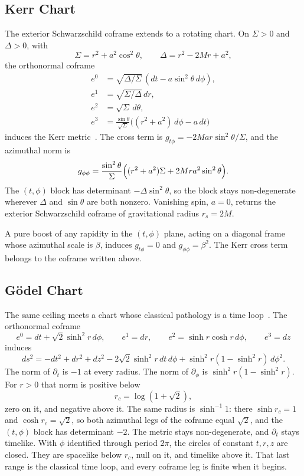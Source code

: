 \documentclass[a4paper]{article}
\begin{document}
\subsection{Kerr Chart}
\label{subsec:kerr}

The exterior Schwarzschild coframe extends to a rotating chart. On $\Sigma>0$ and $\Delta>0$, with
\[
\Sigma=r^2+a^2\cos^2\theta,\qquad\Delta=r^2-2Mr+a^2,
\]
the orthonormal coframe
\begin{align*}
e^0&=\sqrt{\Delta/\Sigma}\,(dt-a\sin^2\theta\,d\phi),\\
e^1&=\sqrt{\Sigma/\Delta}\,dr,\\
e^2&=\sqrt{\Sigma}\,d\theta,\\
e^3&=\frac{\sin\theta}{\sqrt{\Sigma}}\bigl((r^2+a^2)\,d\phi-a\,dt\bigr)
\end{align*}
induces the Kerr metric~\cite{kerr1963}. The cross term is $g_{t\phi}=-2Mar\sin^2\theta/\Sigma$, and the azimuthal norm is
\[
g_{\phi\phi}=\frac{\sin^2\theta}{\Sigma}\Bigl((r^2+a^2)\Sigma+2Mra^2\sin^2\theta\Bigr).
\]
The $(t,\phi)$ block has determinant $-\Delta\sin^2\theta$, so the block stays non-degenerate wherever $\Delta$ and $\sin\theta$ are both nonzero. Vanishing spin, $a=0$, returns the exterior Schwarzschild coframe of gravitational radius $r_s=2M$.

A pure boost of any rapidity in the $(t,\phi)$ plane, acting on a diagonal frame whose azimuthal scale is $\beta$, induces $g_{t\phi}=0$ and $g_{\phi\phi}=\beta^2$. The Kerr cross term belongs to the coframe written above.

\subsection{Gödel Chart}
\label{subsec:godel}

The same ceiling meets a chart whose classical pathology is a time loop~\cite{godel1949}. The orthonormal coframe
\[
e^0=dt+\sqrt{2}\sinh^2 r\,d\phi,\qquad
e^1=dr,\qquad
e^2=\sinh r\cosh r\,d\phi,\qquad
e^3=dz
\]
induces
\[
ds^2=-dt^2+dr^2+dz^2-2\sqrt{2}\sinh^2 r\,dt\,d\phi+\sinh^2 r(1-\sinh^2 r)\,d\phi^2.
\]
The norm of $\partial_t$ is $-1$ at every radius. The norm of $\partial_\phi$ is $\sinh^2 r(1-\sinh^2 r)$. For $r>0$ that norm is positive below
\[
r_c=\log(1+\sqrt{2}),
\]
zero on it, and negative above it. The same radius is $\sinh^{-1}1$: there $\sinh r_c=1$ and $\cosh r_c=\sqrt{2}$, so both azimuthal legs of the coframe equal $\sqrt{2}$, and the $(t,\phi)$ block has determinant $-2$. The metric stays non-degenerate, and $\partial_t$ stays timelike. With $\phi$ identified through period $2\pi$, the circles of constant $t,r,z$ are closed. They are spacelike below $r_c$, null on it, and timelike above it. That last range is the classical time loop, and every coframe leg is finite when it begins.
\end{document}
